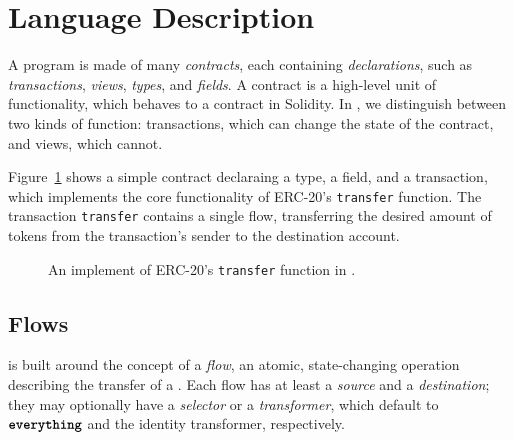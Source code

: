 \documentclass[dvipsnames, usenames, sigconf]{acmart}
\begin{document}


\section{Language Description}

A \langName program is made of many \emph{contracts}, each containing \emph{declarations}, such as \emph{transactions}, \emph{views}, \emph{types}, and \emph{fields}.
A contract is a high-level unit of functionality, which behaves  to a contract in Solidity.
In \langName, we distinguish between two kinds of function: transactions, which can change the state of the contract, and views, which cannot.

Figure~\ref{fig:erc20-transfer} shows a simple contract declaraing a type, a field, and a transaction, which implements the core functionality of ERC-20's \lstinline{transfer} function.
The transaction \lstinline{transfer} contains a single flow, transferring the desired amount of tokens from the transaction's sender to the destination account.

\begin{figure}[h]
    \centering
    
    \caption{An implement of ERC-20's \lstinline{transfer} function in \langName.}
    \label{fig:erc20-transfer}
\end{figure}

\subsection{Flows}
\langName is built around the concept of a \emph{flow}, an atomic, state-changing operation describing the transfer of a \assetTxt.
Each flow has at least a \emph{source} and a \emph{destination}; they may optionally have a \emph{selector} or a \emph{transformer}, which default to $\textbf{\texttt{everything}}$ and the identity transformer, respectively.
\end{document}
